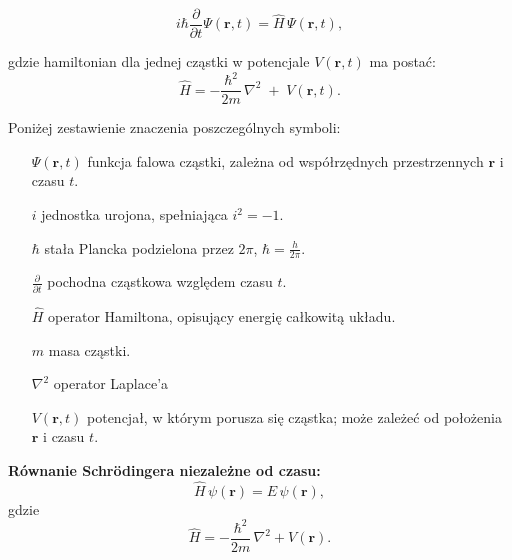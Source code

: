 \begin{equation}
  i \hbar \frac{\partial}{\partial t} \Psi(\mathbf{r},t)
  = \hat{H}\,\Psi(\mathbf{r},t),
\end{equation}

gdzie hamiltonian dla jednej cząstki w potencjale \(V(\mathbf{r},t)\) ma postać:
\begin{equation}
  \hat{H}
  = -\frac{\hbar^2}{2m} \,\nabla^2 \;+\; V(\mathbf{r},t).
\end{equation}

\bigskip
Poniżej zestawienie znaczenia poszczególnych symboli:

\begin{itemize}
  \item[\(\Psi(\mathbf{r},t)\)] funkcja falowa cząstki, zależna od współrzędnych przestrzennych \(\mathbf{r}\) i czasu \(t\).
  \item[\(i\)] jednostka urojona, spełniająca \(i^2 = -1\).
  \item[\(\hbar\)] stała Plancka podzielona przez \(2\pi\), \(\hbar = \frac{h}{2\pi}\).
  \item[\(\frac{\partial}{\partial t}\)] pochodna cząstkowa względem czasu \(t\).
  \item[\(\hat{H}\)] operator Hamiltona, opisujący energię całkowitą układu.
  \item[\(m\)] masa cząstki.
  \item[\(\nabla^2\)] operator Laplace’a
  \item[\(V(\mathbf{r},t)\)] potencjał, w którym porusza się cząstka; może zależeć od położenia \(\mathbf{r}\) i czasu \(t\).
\end{itemize}

\textbf{Równanie Schrödingera niezależne od czasu:}
\[
\hat{H}\,\psi(\mathbf{r}) = E\,\psi(\mathbf{r}),
\]
gdzie
\[
\hat{H} = -\frac{\hbar^2}{2m}\,\nabla^2 + V(\mathbf{r}).
\]

